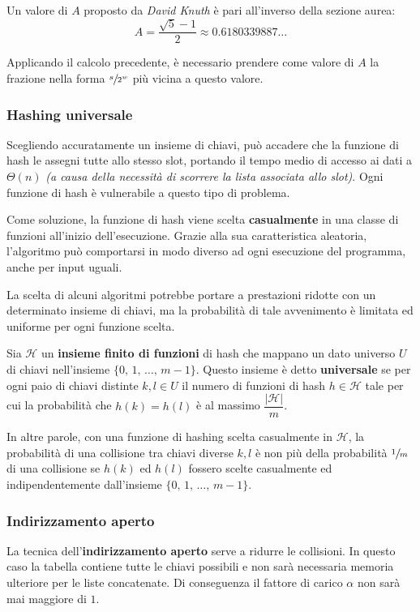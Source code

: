 \documentclass[italian, 10pt]{article}
\begin{document}
Un valore di \(A\) proposto da \textit{David Knuth} è pari all'inverso della sezione aurea:
\[ A = \dfrac{\sqrt{5} - 1}{2} \approx 0.6180339887 \ldots \]

Applicando il calcolo precedente, è necessario prendere come valore di \(A\) la frazione nella forma \(\sfrac{s}{2^w}\) più vicina a questo valore.

\subsubsection{Hashing universale}

Scegliendo accuratamente un insieme di chiavi, può accadere che la funzione di hash le assegni tutte allo stesso slot, portando il tempo medio di accesso ai dati a \(\Theta(n)\) \textit{(a causa della necessità di scorrere la lista associata allo slot)}.
Ogni funzione di hash è vulnerabile a questo tipo di problema.

Come soluzione, la funzione di hash viene scelta \textbf{casualmente} in una classe di funzioni all'inizio dell'esecuzione.
Grazie alla sua caratteristica aleatoria, l'algoritmo può comportarsi in modo diverso ad ogni esecuzione del programma, anche per input uguali.

La scelta di alcuni algoritmi potrebbe portare a prestazioni ridotte con un determinato insieme di chiavi, ma la probabilità di tale avvenimento è limitata ed uniforme per ogni funzione scelta.

\bigskip
Sia \(\mathscr{H}\) un \textbf{insieme finito di funzioni} di hash che mappano un dato universo \(U\) di chiavi nell'insieme \(\{0,\, 1, \, \ldots, \, m-1\}\).
Questo insieme è detto \textbf{universale} se per ogni paio di chiavi distinte \(k, l \in U\) il numero di funzioni di hash \(h \in \mathscr{H}\) tale per cui la probabilità che \(h(k) = h(l)\) è al massimo \(\dfrac{|\mathscr{H}|}{m}\).

\bigskip
In altre parole, con una funzione di hashing scelta casualmente in \(\mathscr{H}\), la probabilità di una collisione tra chiavi diverse \(k, l\) è non più della probabilità \(\sfrac{1}{m}\) di una collisione se \(h(k)\) ed \(h(l)\) fossero scelte casualmente ed indipendentemente dall'insieme \(\{0, \, 1, \, \ldots, \, m-1\}\).

\subsubsection{Indirizzamento aperto}
La tecnica dell'\textbf{indirizzamento aperto} serve a ridurre le collisioni.
In questo caso la tabella contiene tutte le chiavi possibili e non sarà necessaria memoria ulteriore per le liste concatenate.
Di conseguenza il fattore di carico \(\alpha\) non sarà mai maggiore di \(1\).
\end{document}

